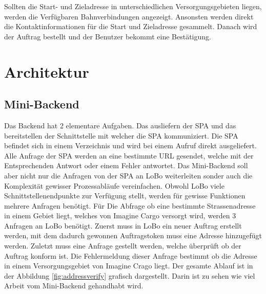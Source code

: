 Sollten die Start- und Zieladresse in unterschiedlichen Versorgungsgebieten liegen, werden die Verfügbaren Bahnverbindungen angezeigt. Ansonsten werden direkt die Kontaktinformationen für die Start und Zieladresse gesammelt. Danach wird der Auftrag bestellt und der Benutzer bekommt eine Bestätigung.


\section{Architektur}
\label{sec:architektur}

\subsection{Mini-Backend}
Das Backend hat 2 elementare Aufgaben. Das ausliefern der SPA und das bereitstellen der Schnittstelle mit welcher die SPA kommuniziert. Die SPA befindet sich in einem Verzeichnis und wird bei einem Aufruf direkt ausgeliefert. Alle Anfrage der SPA werden an eine bestimmte URL gesendet, welche mit der Entsprechenden Antwort oder einem Fehler antwortet. Das Mini-Backend soll aber nicht nur die Anfragen von der SPA an LoBo weiterleiten sonder auch die Komplexität gewisser Prozessabläufe vereinfachen. Obwohl LoBo viele Schnittstellenendpunkte zur Verfügung stellt, werden für gewisse Funktionen mehrere Anfragen benötigt. Für Die Abfrage ob eine bestimmte Strassenadresse in einem Gebiet liegt, welches von Imagine Cargo versorgt wird, werden 3 Anfragen an LoBo benötigt. Zuerst muss in LoBo ein neuer Auftrag erstellt werden, mit dem dadurch gewonnen Auftragstoken muss eine Adresse hinzugefügt werden. Zuletzt muss eine Anfrage gestellt werden, welche überprüft ob der Auftrag konform ist. Die Fehlermeldung dieser Anfrage bestimmt ob die Adresse in einem Versorgungsgebiet von Imagine Crago liegt. Der gesamte Ablauf ist in der Abbildung \ref{fig:addressverify} grafisch dargestellt. Darin ist zu sehen wie viel Arbeit vom Mini-Backend gehandhabt wird.


